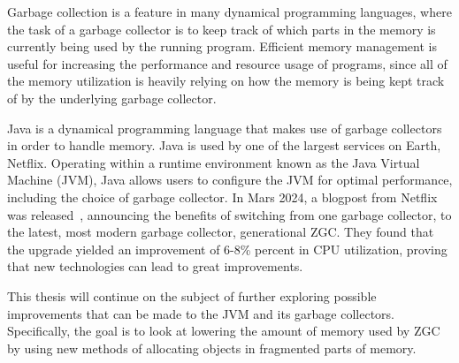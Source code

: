 
Garbage collection is a feature in many dynamical programming languages, where the task of a garbage collector is to keep track of which parts in the memory is currently being used by the running program. Efficient memory management is useful for increasing the performance and resource usage of programs, since all of the memory utilization is heavily relying on how the memory is being kept track of by the underlying garbage collector.

Java is a dynamical programming language that makes use of garbage collectors in order to handle memory. Java is used by one of the largest services on Earth, Netflix. Operating within a runtime environment known as the Java Virtual Machine (JVM), Java allows users to configure the JVM for optimal performance, including the choice of garbage collector. In Mars 2024, a blogpost from Netflix was released~\cite{netflix:zgc}, announcing the benefits of switching from one garbage collector, to the latest, most modern garbage collector, generational ZGC. They found that the upgrade yielded an improvement of 6-8\% percent in CPU utilization, proving that new technologies can lead to great improvements.

This thesis will continue on the subject of further exploring possible improvements that can be made to the JVM and its garbage collectors. Specifically, the goal is to look at lowering the amount of memory used by ZGC by using new methods of allocating objects in fragmented parts of memory. 